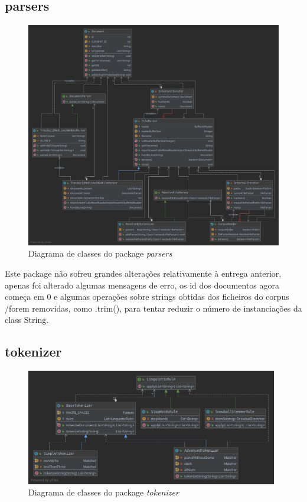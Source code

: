 \documentclass[12pt]{article}
\begin{document}
\subsection{parsers}
\begin{figure}[H]
  \center
  \includegraphics[width=12cm]{packages_parsers}
  \caption{Diagrama de classes do package \it parsers}
\end{figure}

Este package não sofreu grandes alterações relativamente à entrega
anterior, apenas foi alterado algumas mensagens de erro, os id dos
documentos agora começa em 0 e algumas operações sobre strings
obtidas dos ficheiros do corpus /forem removidas, como .trim(), para
tentar reduzir o número de instanciações da class String.

\subsection{tokenizer}
\begin{figure}[h]
  \center
  \includegraphics[width=11cm]{packages_tokenizer.png}
  \caption{Diagrama de classes do package \it tokenizer}
\end{figure}
\end{document}
